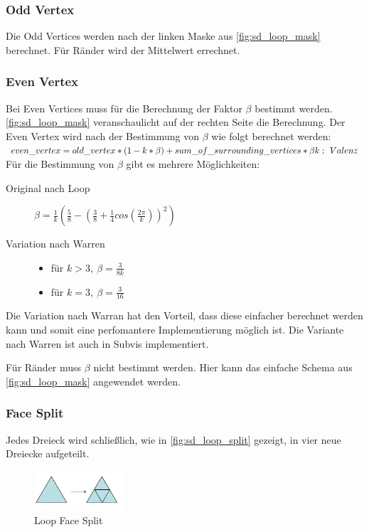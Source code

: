 \subsubsection*{Odd Vertex}
Die Odd Vertices werden nach der linken Maske aus \autoref{fig:sd_loop_mask} berechnet.
Für Ränder wird der Mittelwert errechnet.

\subsubsection*{Even Vertex}

Bei Even Vertices muss für die Berechnung der Faktor \(\beta\) bestimmt werden.
\autoref{fig:sd_loop_mask} veranschaulicht auf der rechten Seite die Berechnung.
Der Even Vertex wird nach der Bestimmung von \(\beta\) wie folgt berechnet werden:\\
\(
even\_vertex = old\_vertex * (1 - k * \beta) + sum\_of\_surrounding\_vertices * \beta\\
k:\ Valenz
\)
\\
Für die Bestimmung von \(\beta\) gibt es mehrere Möglichkeiten:
\begin{description}
\item[Original nach Loop]  \(\beta=\frac{1}{k}(\frac{5}{8}-(\frac{3}{8}+\frac{1}{4}cos(\frac{2\pi}{k}))^2)\)
\item[Variation nach Warren] \mbox{}
	\begin{itemize}
		\item für \(k > 3,\ \beta = \frac{3}{8k}\)
		\item für \(k = 3,\ \beta = \frac{3}{16}\)	
	\end{itemize}
\end{description}
Die Variation nach Warran hat den Vorteil, dass diese einfacher berechnet werden kann
und somit eine perfomantere Implementierung möglich ist.
Die Variante nach Warren ist auch in Subvis implementiert.

Für Ränder muss \(\beta\) nicht bestimmt werden.
Hier kann das einfache Schema aus \autoref{fig:sd_loop_mask} angewendet werden.
\cite{Carnegie}
\cite{Standford.Loop}
\cite[S. 70f]{Zorin.subdivcourse}

\subsubsection*{Face Split}

Jedes Dreieck wird schließlich, wie in \autoref{fig:sd_loop_split} gezeigt, in vier neue Dreiecke aufgeteilt.

\begin{figure}
\centering
\includegraphics[width=0.3\textwidth]{content/media/sd_loop_split.png}
\caption{Loop Face Split \cite[S. 56f]{Standford.24.07.2015}}
\label{fig:sd_loop_split}
\end{figure}

